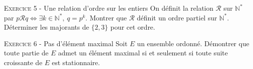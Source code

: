 \documentclass[11pt]{article}
\begin{document}


\vskip0.3cm\noindent\textsc{Exercice 5} - Une relation d'ordre sur les entiers
\vskip0.2cm
On définit la relation $\mathcal R$ sur $\mathbb N^*$ par $p\mathcal R q\iff \exists k\in\mathbb N^*,\ q=p^k$. Montrer que $\mathcal R$ définit un ordre partiel sur $\mathbb N^*$.
Déterminer les majorants de $\{2,3\}$ pour cet ordre.




\vskip0.3cm\noindent\textsc{Exercice 6} - Pas d'élément maximal
\vskip0.2cm
Soit $E$ un ensemble ordonné. Démontrer que toute partie de $E$ admet un élément maximal si et seulement si toute suite croissante de $E$ est stationnaire.




\vskip0.5cm

\end{document}
